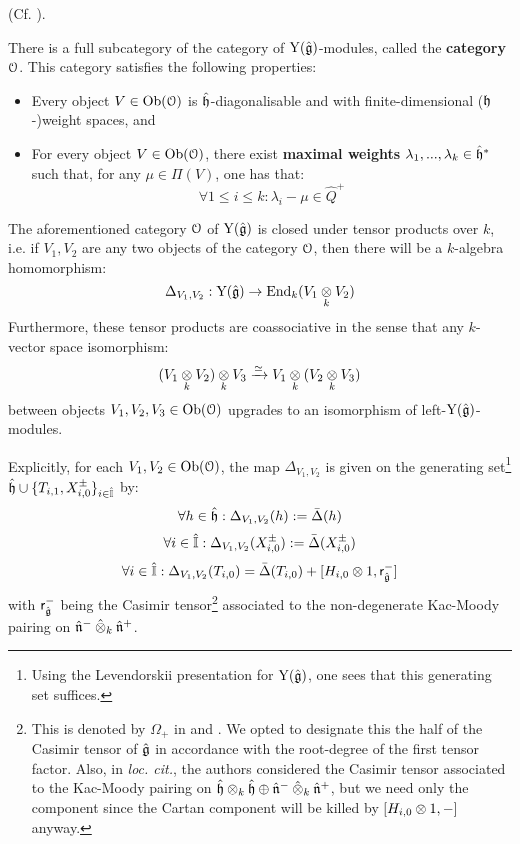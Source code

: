         \begin{lemma} \label{lemma: category_O_affine_yangian}
            (Cf. \cite[Theorem 4.9]{guay_nakajima_wendlandt_affine_yangian_coproduct}).
        
            There is a full subcategory of the category of $\mathrm{Y}(\hat{\mathfrak{g}})$-modules, called the \textbf{category $\mathcal{O}$}. This category satisfies the following properties:
            \begin{itemize}
                \item Every object $V \in \mathrm{Ob}(\mathcal{O})$ is $\hat{\mathfrak{h}}$-diagonalisable and with finite-dimensional ($\mathfrak{h}$-)weight spaces, and
                \item For every object $V \in \mathrm{Ob}(\mathcal{O})$, there exist \textbf{maximal weights} $\lambda_1, ..., \lambda_k \in \hat{\mathfrak{h}}^*$ such that, for any $\mu \in \Pi(V)$, one has that:
                    $$\forall 1 \leq i \leq k: \lambda_i - \mu \in \hat{Q}^+$$
            \end{itemize}

            The aforementioned category $\mathcal{O}$ of $\mathrm{Y}(\hat{\mathfrak{g}})$ is closed under tensor products over $k$, i.e. if $V_1, V_2$ are any two objects of the category $\mathcal{O}$, then there will be a $k$-algebra homomorphism:
                $$\Delta_{V_1, V_2}: \rmY(\hat{\g}) \to \End_k(V_1 \tensor_k V_2)$$
            Furthermore, these tensor products are coassociative in the sense that any $k$-vector space isomorphism:
                $$(V_1 \tensor_k V_2) \tensor_k V_3 \xrightarrow[]{\cong} V_1 \tensor_k (V_2 \tensor_k V_3)$$
            between objects $V_1, V_2, V_3 \in \mathrm{Ob}(\mathcal{O})$ upgrades to an isomorphism of left-$\mathrm{Y}(\hat{\mathfrak{g}})$-modules.

            Explicitly, for each $V_1, V_2 \in \mathrm{Ob}(\mathcal{O})$, the map $\Delta_{V_1, V_2}$ is given on the generating set\footnote{Using the Levendorskii presentation for $\mathrm{Y}(\hat{\mathfrak{g}})$, one sees that this generating set suffices.} $\hat{\mathfrak{h}} \cup \{T_{i, 1}, X_{i, 0}^{\pm}\}_{i \in \hat{\mathbb{I}}}$ by:
                $$\forall h \in \hat{\mathfrak{h}}: \Delta_{V_1, V_2}(h) := \bar{\Delta}(h)$$
                $$\forall i \in \hat{\mathbb{I}}: \Delta_{V_1, V_2}(X_{i, 0}^{\pm}) := \bar{\Delta}(X_{i, 0}^{\pm})$$
                $$\forall i \in \hat{\simpleroots}: \Delta_{V_1, V_2}(T_{i, 0}) = \bar{\Delta}(T_{i, 0}) + [H_{i, 0} \tensor 1, \sfr_{ \hat{\g} }^-]$$
            with $\mathsf{r}_{ \hat{\mathfrak{g}} }^-$ being the Casimir tensor\footnote{This is denoted by $\Omega_+$ in \cite{guay_nakajima_wendlandt_affine_yangian_coproduct} and \cite{guay_nakajima_wendlandt_affine_yangian_vertex_representations_and_PBW}. We opted to designate this the  half of the Casimir tensor of $\hat{\mathfrak{g}}$ in accordance with the root-degree of the first tensor factor. Also, in \textit{loc. cit.}, the authors considered the Casimir tensor associated to the Kac-Moody pairing on $\hat{\h} \tensor_k \hat{\h} \oplus \hat{\n}^- \hattensor_k \hat{\n}^+$, but we need only the  component since the Cartan component will be killed by $[H_{i, 0} \tensor 1, -]$ anyway.} associated to the non-degenerate Kac-Moody pairing on $\hat{\n}^- \hattensor_k \hat{\n}^+$.
        \end{lemma}
